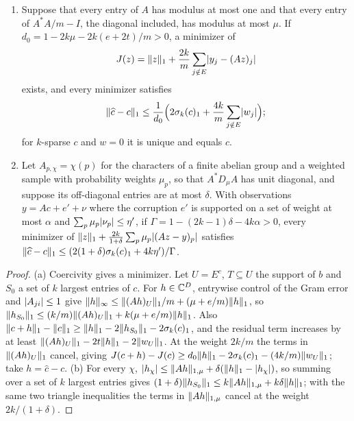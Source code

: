\begin{theorem}\label{dir:thm:decoder}
\begin{enumerate}[label=\textup{(\alph*)}]
\item Suppose that every entry of $A$ has modulus at most one and that every entry of $A^*A/m-I$,
the diagonal included, has modulus at most $\mu$. If $d_0=1-2k\mu-2k(e+2t)/m>0$, a minimizer of
\[
 J(z)=\lVert z\rVert_1+\frac{2k}m\sum_{j\notin E}\lvert y_j-(Az)_j\rvert
\]
exists, and every minimizer satisfies
\[
 \lVert\widehat c-c\rVert_1\le\frac1{d_0}\Bigl(2\sigma_k(c)_1+\frac{4k}m\sum_{j\notin E}\lvert w_j\rvert\Bigr);
\]
for $k$-sparse $c$ and $w=0$ it is unique and equals $c$.
\item Let $A_{p,\chi}=\chi(p)$ for the characters of a finite abelian group and a weighted sample with
probability weights $\mu_p$, so that $A^*D_\mu A$ has unit diagonal, and suppose its off-diagonal entries are at
most $\delta$. With observations $y=Ac+e'+\nu$ where the corruption $e'$ is supported on a set of weight at
most $\alpha$ and $\sum_p\mu_p\lvert\nu_p\rvert\le\eta'$, if $\Gamma=1-(2k-1)\delta-4k\alpha>0$, every minimizer of
$\lVert z\rVert_1+\frac{2k}{1+\delta}\sum_p\mu_p\lvert(Az-y)_p\rvert$ satisfies
$\lVert\widehat c-c\rVert_1\le(2(1+\delta)\sigma_k(c)_1+4k\eta')/\Gamma$.
\end{enumerate}
\end{theorem}

\begin{proof}
(a) Coercivity gives a minimizer. Let $U=E^c$, $T\subseteq U$ the support of $b$ and $S_0$ a set of $k$
largest entries of $c$. For $h\in\mathbb{C}^D$, entrywise control of the Gram error and $\lvert A_{ji}\rvert\le1$ give
$\lVert h\rVert_\infty\le\lVert(Ah)_U\rVert_1/m+(\mu+e/m)\lVert h\rVert_1$, so
$\lVert h_{S_0}\rVert_1\le(k/m)\lVert(Ah)_U\rVert_1+k(\mu+e/m)\lVert h\rVert_1$. Also
$\lVert c+h\rVert_1-\lVert c\rVert_1\ge\lVert h\rVert_1-2\lVert h_{S_0}\rVert_1-2\sigma_k(c)_1$, and the residual term increases by at least
$\lVert(Ah)_U\rVert_1-2t\lVert h\rVert_1-2\lVert w_U\rVert_1$. At the weight $2k/m$ the terms in $\lVert(Ah)_U\rVert_1$ cancel, giving
$J(c+h)-J(c)\ge d_0\lVert h\rVert_1-2\sigma_k(c)_1-(4k/m)\lVert w_U\rVert_1$; take $h=\widehat c-c$.
(b) For every $\chi$, $\lvert h_\chi\rvert\le\lVert Ah\rVert_{1,\mu}+\delta(\lVert h\rVert_1-\lvert h_\chi\rvert)$, so summing over a set of $k$
largest entries gives $(1+\delta)\lVert h_{S_0}\rVert_1\le k\lVert Ah\rVert_{1,\mu}+k\delta\lVert h\rVert_1$; with the same two
triangle inequalities the terms in $\lVert Ah\rVert_{1,\mu}$ cancel at the weight $2k/(1+\delta)$.
\end{proof}

